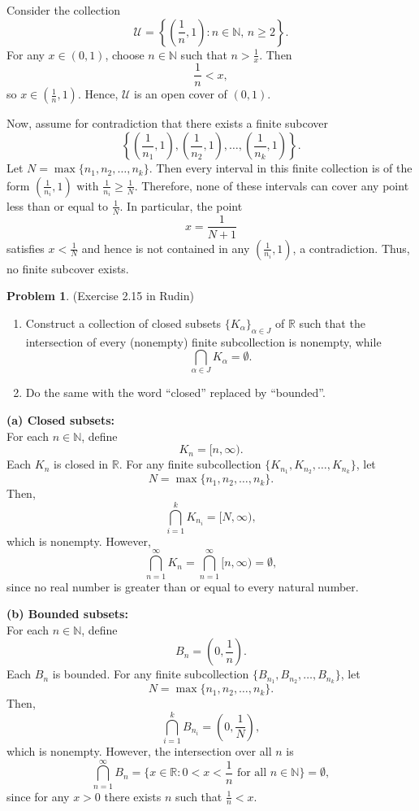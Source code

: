 \documentclass[12pt,oneside]{article}
\theoremstyle{definition}
\newtheorem{problem}{Problem}
\begin{document}
\newpage
\begin{solution}
Consider the collection
\[
\mathcal{U} = \left\{ \left(\frac{1}{n}, 1\right) : n \in \mathbb{N},\, n\geq 2 \right\}.
\]
For any \(x \in (0,1)\), choose \(n \in \mathbb{N}\) such that \(n > \frac{1}{x}\). Then
\[
\frac{1}{n} < x,
\]
so \(x \in \left(\frac{1}{n}, 1\right)\). Hence, \(\mathcal{U}\) is an open cover of \((0,1)\).

Now, assume for contradiction that there exists a finite subcover
\[
\left\{\left(\frac{1}{n_1},1\right), \left(\frac{1}{n_2},1\right), \ldots, \left(\frac{1}{n_k},1\right)\right\}.
\]
Let \(N = \max\{n_1,n_2,\ldots,n_k\}\). Then every interval in this finite collection is of the form \(\left(\frac{1}{n_i},1\right)\) with \(\frac{1}{n_i} \ge \frac{1}{N}\). Therefore, none of these intervals can cover any point less than or equal to \(\frac{1}{N}\). In particular, the point
\[
x = \frac{1}{N+1}
\]
satisfies \(x < \frac{1}{N}\) and hence is not contained in any \(\left(\frac{1}{n_i},1\right)\), a contradiction. Thus, no finite subcover exists.
\end{solution}

\bigskip

\newpage
\begin{problem}
(Exercise 2.15 in Rudin)
\begin{enumerate}
  \item Construct a collection of closed subsets \(\{K_{\alpha}\}_{\alpha \in J}\) of \(\mathbb{R}\) such that the intersection of every (nonempty) finite subcollection is nonempty, while 
  \[
  \bigcap_{\alpha \in J} K_\alpha = \emptyset.
  \]
  \item Do the same with the word ``closed'' replaced by ``bounded''.
\end{enumerate}
\end{problem}

\newpage
\begin{solution}
\textbf{(a) Closed subsets:} \\
For each \(n \in \mathbb{N}\), define
\[
K_n = [n, \infty).
\]
Each \(K_n\) is closed in \(\mathbb{R}\). For any finite subcollection \(\{K_{n_1}, K_{n_2}, \ldots, K_{n_k}\}\), let
\[
N = \max\{n_1, n_2, \ldots, n_k\}.
\]
Then,
\[
\bigcap_{i=1}^k K_{n_i} = [N, \infty),
\]
which is nonempty. However,
\[
\bigcap_{n=1}^\infty K_n = \bigcap_{n=1}^\infty [n,\infty) = \emptyset,
\]
since no real number is greater than or equal to every natural number.

\bigskip

\textbf{(b) Bounded subsets:} \\
For each \(n \in \mathbb{N}\), define
\[
B_n = \left(0, \frac{1}{n}\right).
\]
Each \(B_n\) is bounded. For any finite subcollection \(\{B_{n_1}, B_{n_2}, \ldots, B_{n_k}\}\), let
\[
N = \max\{n_1, n_2, \ldots, n_k\}.
\]
Then,
\[
\bigcap_{i=1}^k B_{n_i} = \left(0, \frac{1}{N}\right),
\]
which is nonempty. However, the intersection over all \(n\) is
\[
\bigcap_{n=1}^\infty B_n = \{x \in \mathbb{R} : 0 < x < \frac{1}{n} \text{ for all } n\in\mathbb{N}\} = \emptyset,
\]
since for any \(x>0\) there exists \(n\) such that \(\frac{1}{n} < x\).
\end{solution}
\end{document}
